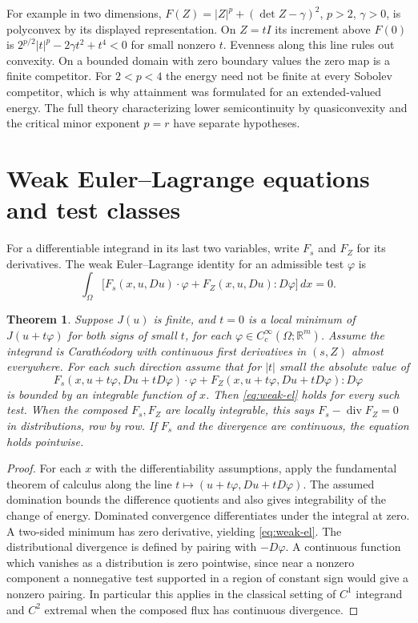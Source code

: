 \documentclass[11pt,oneside,openany]{book}
\newcommand{\R}{\mathbb R}
\theoremstyle{plain}
\newtheorem{theorem}{Theorem}[chapter]
\theoremstyle{definition}
\theoremstyle{remark}
\begin{document}
For example in two dimensions,
\(F(Z)=|Z|^p+(\det Z-\gamma)^2\), \(p>2\), \(\gamma>0\),
is polyconvex by its displayed representation. On \(Z=tI\)
its increment above \(F(0)\) is
\(2^{p/2}|t|^p-2\gamma t^2+t^4<0\) for small nonzero \(t\).
Evenness along this line rules out convexity. On a bounded
domain with zero boundary values the zero map is a finite
competitor. For \(2<p<4\) the energy need not be finite
at every Sobolev competitor, which is why attainment was
formulated for an extended-valued energy. The full theory
characterizing lower semicontinuity by quasiconvexity and the
critical minor exponent \(p=r\) have separate hypotheses.

\section{Weak Euler--Lagrange equations and test classes}
\label{v08-07}

For a differentiable integrand in its last two variables,
write \(F_s\) and \(F_Z\) for its derivatives. The weak
Euler--Lagrange identity for an admissible test \(\varphi\) is
\begin{equation}\label{eq:weak-el}
 \int_\Omega\bigl[F_s(x,u,Du)\cdot\varphi
                    +F_Z(x,u,Du):D\varphi\bigr]\,dx=0 .
\end{equation}

\begin{theorem}\label{thm:el-dominated}
Suppose \(J(u)\) is finite, and \(t=0\) is a local minimum of
\(J(u+t\varphi)\) for both signs of small \(t\), for each
\(\varphi\in C^\infty_c(\Omega;\R^m)\). Assume the integrand is
Carath\'eodory with continuous first derivatives in \((s,Z)\)
almost everywhere. For each such direction assume that for
\(|t|\) small the absolute value of
\[
 F_s(x,u+t\varphi,Du+tD\varphi)\cdot\varphi
   +F_Z(x,u+t\varphi,Du+tD\varphi):D\varphi
\]
is bounded by an integrable function of \(x\). Then
\eqref{eq:weak-el} holds for every such test. When the composed
\(F_s,F_Z\) are locally integrable, this says
\(F_s-\operatorname{div} F_Z=0\) in distributions, row by row.
If \(F_s\) and the divergence are continuous, the equation
holds pointwise.
\end{theorem}

\begin{proof}
For each \(x\) with the differentiability assumptions,
apply the fundamental theorem of calculus along the line
\(t\mapsto(u+t\varphi,Du+tD\varphi)\). The assumed domination
bounds the difference quotients and also gives integrability
of the change of energy. Dominated convergence differentiates
under the integral at zero. A two-sided minimum has zero
derivative, yielding \eqref{eq:weak-el}. The distributional
divergence is defined by pairing with \(-D\varphi\).
A continuous function which vanishes as a distribution is
zero pointwise, since near a nonzero component a nonnegative
test supported in a region of constant sign would give a
nonzero pairing. In particular this applies in the classical
setting of \(C^1\) integrand and \(C^2\) extremal when the
composed flux has continuous divergence.
\end{proof}
\end{document}
